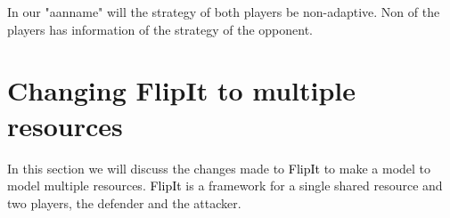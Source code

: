 \documentclass[a4paper, 11pt]{article}
\newcommand{\flip}[1] {\textcolor{black}{#1}}
\begin{document}
In our "aanname" will the strategy of both players be non-adaptive. Non of the players has information of the strategy of the opponent. 

\section{Changing FlipIt to multiple resources}
\label{Section:FLipItmulti}
In this section we will discuss the changes made to \flip{FlipIt} to make a model to model multiple resources. 
\flip{FlipIt} is a framework for a single shared resource and two players, the defender and the attacker. 
\end{document}
